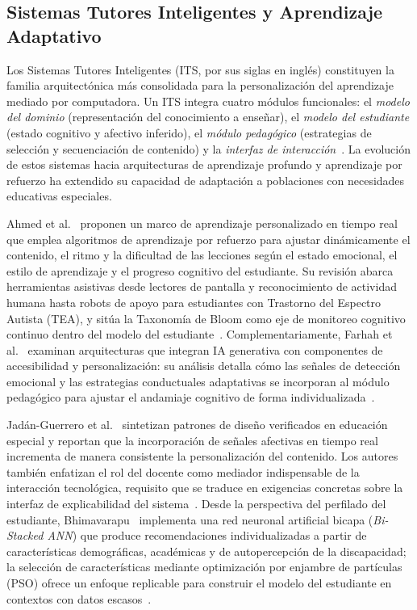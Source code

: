 \subsection{Sistemas Tutores Inteligentes y Aprendizaje Adaptativo}

Los Sistemas Tutores Inteligentes (ITS, por sus siglas en inglés) constituyen
la familia arquitectónica más consolidada para la personalización del aprendizaje
mediado por computadora. Un ITS integra cuatro módulos funcionales: el
\textit{modelo del dominio} (representación del conocimiento a enseñar), el
\textit{modelo del estudiante} (estado cognitivo y afectivo inferido), el
\textit{módulo pedagógico} (estrategias de selección y secuenciación de
contenido) y la \textit{interfaz de interacción}~\cite{Ahmed2025}. La evolución
de estos sistemas hacia arquitecturas de aprendizaje profundo y aprendizaje por
refuerzo ha extendido su capacidad de adaptación a poblaciones con necesidades
educativas especiales.

Ahmed et al.~\cite{Ahmed2025} proponen un marco de aprendizaje personalizado en
tiempo real que emplea algoritmos de aprendizaje por refuerzo para ajustar
dinámicamente el contenido, el ritmo y la dificultad de las lecciones según el
estado emocional, el estilo de aprendizaje y el progreso cognitivo del
estudiante. Su revisión abarca herramientas asistivas desde lectores de pantalla
y reconocimiento de actividad humana hasta robots de apoyo para estudiantes con
Trastorno del Espectro Autista (TEA), y sitúa la Taxonomía de Bloom como eje de monitoreo cognitivo continuo
dentro del modelo del estudiante~\cite{Ahmed2025}. Complementariamente,
Farhah et al.~\cite{Farhah2025} examinan arquitecturas que integran IA
generativa con componentes de accesibilidad y personalización: su análisis
detalla cómo las señales de detección emocional y las estrategias conductuales
adaptativas se incorporan al módulo pedagógico para ajustar el andamiaje
cognitivo de forma individualizada~\cite{Farhah2025}.

Jadán-Guerrero et al.~\cite{Jadan2024} sintetizan patrones de diseño verificados
en educación especial y reportan que la incorporación de señales afectivas en
tiempo real incrementa de manera consistente la personalización del contenido.
Los autores también enfatizan el rol del docente como mediador indispensable de
la interacción tecnológica, requisito que se traduce en exigencias concretas
sobre la interfaz de explicabilidad del sistema~\cite{Jadan2024}. Desde la
perspectiva del perfilado del estudiante, Bhimavarapu~\cite{Bhimavarapu2025}
implementa una red neuronal artificial bicapa (\textit{Bi-Stacked ANN}) que
produce recomendaciones individualizadas a partir de características demográficas,
académicas y de autopercepción de la discapacidad; la selección de características
mediante optimización por enjambre de partículas (PSO) ofrece un enfoque
replicable para construir el modelo del estudiante en contextos con datos
escasos~\cite{Bhimavarapu2025}.

